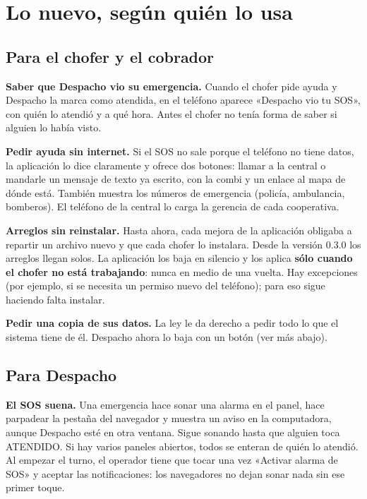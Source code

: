 \documentclass[12pt,a4paper]{article}
\begin{document}
\section{Lo nuevo, según quién lo usa}

\subsection{Para el chofer y el cobrador}

\textbf{Saber que Despacho vio su emergencia.} Cuando el chofer pide ayuda y
Despacho la marca como atendida, en el teléfono aparece «Despacho vio tu SOS»,
con quién lo atendió y a qué hora. Antes el chofer no tenía forma de saber si
alguien lo había visto.

\textbf{Pedir ayuda sin internet.} Si el SOS no sale porque el teléfono no
tiene datos, la aplicación lo dice claramente y ofrece dos botones: llamar a
la central o mandarle un mensaje de texto ya escrito, con la combi y un enlace
al mapa de dónde está. También muestra los números de emergencia (policía,
ambulancia, bomberos). El teléfono de la central lo carga la gerencia de cada
cooperativa.

\textbf{Arreglos sin reinstalar.} Hasta ahora, cada mejora de la aplicación
obligaba a repartir un archivo nuevo y que cada chofer lo instalara. Desde la
versión 0.3.0 los arreglos llegan solos. La aplicación los baja en silencio y
los aplica \textbf{sólo cuando el chofer no está trabajando}: nunca en medio de
una vuelta. Hay excepciones (por ejemplo, si se necesita un permiso nuevo del
teléfono); para eso sigue haciendo falta instalar.

\textbf{Pedir una copia de sus datos.} La ley le da derecho a pedir todo lo
que el sistema tiene de él. Despacho ahora lo baja con un botón (ver más
abajo).

\subsection{Para Despacho}

\textbf{El SOS suena.} Una emergencia hace sonar una alarma en el panel, hace
parpadear la pestaña del navegador y muestra un aviso en la computadora,
aunque Despacho esté en otra ventana. Sigue sonando hasta que alguien toca
ATENDIDO. Si hay varios paneles abiertos, todos se enteran de quién lo
atendió. Al empezar el turno, el operador tiene que tocar una vez «Activar
alarma de SOS» y aceptar las notificaciones: los navegadores no dejan sonar
nada sin ese primer toque.
\end{document}

